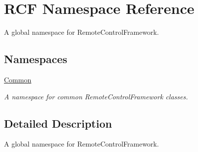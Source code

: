 \hypertarget{namespace_r_c_f}{}\section{R\+C\+F Namespace Reference}
\label{namespace_r_c_f}


A global namespace for Remote\+Control\+Framework.  


\subsection*{Namespaces}
\begin{DoxyCompactItemize}
\item 
 \hyperlink{namespace_r_c_f_1_1_common}{Common}
\begin{DoxyCompactList}\small\item\em A namespace for common Remote\+Control\+Framework classes. \end{DoxyCompactList}\end{DoxyCompactItemize}


\subsection{Detailed Description}
A global namespace for Remote\+Control\+Framework. 